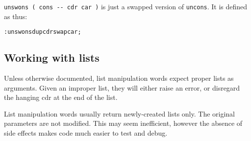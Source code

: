 \documentclass[english]{article}
\begin{document}
\texttt{unswons ( cons -{}- cdr car )} is just a swapped version of \texttt{uncons}. It is defined as thus:

\begin{alltt}
: unswons dup cdr swap car ;
\end{alltt}

\subsection{Working with lists}

Unless otherwise documented, list manipulation words expect proper
lists as arguments. Given an improper list, they will either raise
an error, or disregard the hanging cdr at the end of the list.

List manipulation words usually return newly-created
lists only. The original parameters are not modified. This may seem
inefficient, however the absence of side effects makes code much easier
to test and debug.%
\end{document}
